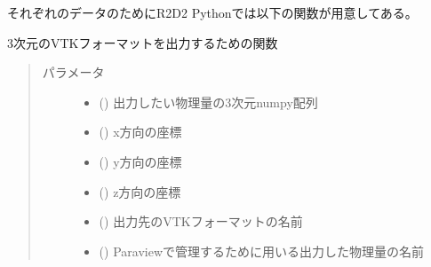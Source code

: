 \documentclass[letterpaper,10pt,dvipdfmx,report]{sphinxmanual}
\begin{document}
それぞれのデータのためにR2D2 Pythonでは以下の関数が用意してある。

\begin{fulllineitems}
\label{\detokenize{paraview:R2D2.vtk.write_3D}}
3次元のVTKフォーマットを出力するための関数
\begin{quote}\begin{description}
\item[{パラメータ}] \leavevmode\begin{itemize}
\item {} 
 () \sphinxhyphen{}\sphinxhyphen{} 出力したい物理量の3次元numpy配列

\item {} 
 () \sphinxhyphen{}\sphinxhyphen{} x方向の座標

\item {} 
 () \sphinxhyphen{}\sphinxhyphen{} y方向の座標

\item {} 
 () \sphinxhyphen{}\sphinxhyphen{} z方向の座標

\item {} 
 () \sphinxhyphen{}\sphinxhyphen{} 出力先のVTKフォーマットの名前

\item {} 
 () \sphinxhyphen{}\sphinxhyphen{} Paraviewで管理するために用いる出力した物理量の名前

\end{itemize}

\end{description}\end{quote}

\end{fulllineitems}
\end{document}
